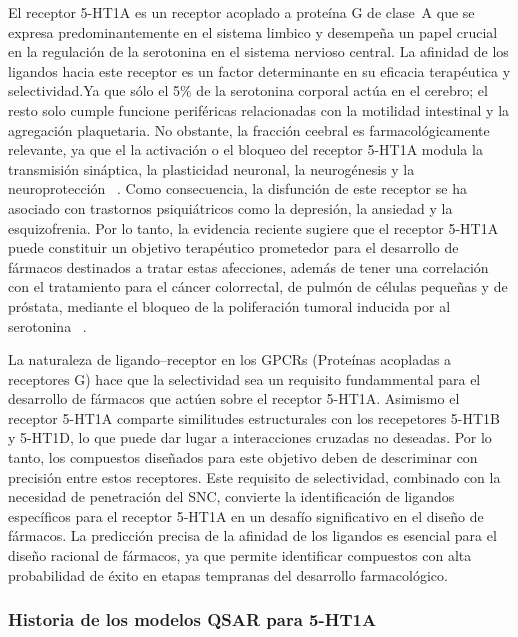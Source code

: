 El receptor 5-HT1A es un receptor acoplado a proteína G de clase~A que se expresa predominantemente en el sistema limbico y desempeña un papel crucial en la regulación de la serotonina en el sistema nervioso central. La afinidad de los ligandos hacia este receptor es un factor determinante en su eficacia terapéutica y selectividad.Ya que sólo el 5\% de la serotonina corporal actúa en el cerebro; el resto solo cumple funcione periféricas relacionadas con la motilidad intestinal y la agregación plaquetaria. No obstante, la fracción ceebral es farmacológicamente relevante, ya que el la activación o el bloqueo del receptor 5-HT1A modula la transmisión sináptica, la plasticidad neuronal, la neurogénesis y la neuroprotección ~\cite{czub_curated_2021}. Como consecuencia, la disfunción de este receptor se ha asociado con trastornos psiquiátricos como la depresión, la ansiedad y la esquizofrenia. Por lo tanto, la evidencia reciente sugiere que el receptor 5-HT1A puede constituir un objetivo terapéutico prometedor para el desarrollo de fármacos destinados a tratar estas afecciones, además de tener una correlación con el tratamiento para el cáncer colorrectal, de pulmón de células pequeñas y de próstata, mediante el bloqueo de la poliferación tumoral inducida por al serotonina ~\cite{czub_curated_2021}.


La naturaleza de ligando--receptor en los GPCRs (Proteínas acopladas a receptores G) hace que la selectividad sea un requisito fundammental para el desarrollo de fármacos que actúen sobre el receptor 5-HT1A. Asimismo el receptor 5-HT1A comparte similitudes estructurales con los recepetores 5-HT1B y 5-HT1D, lo que puede dar lugar a interacciones cruzadas no deseadas. Por lo tanto, los compuestos diseñados para este objetivo deben de descriminar con precisión entre estos receptores. Este requisito de selectividad, combinado con la necesidad de penetración del SNC, convierte la identificación de ligandos específicos para el receptor 5-HT1A en un desafío significativo en el diseño de fármacos. La predicción precisa de la afinidad de los ligandos es esencial para el diseño racional de fármacos, ya que permite identificar compuestos con alta probabilidad de éxito en etapas tempranas del desarrollo farmacológico. 

\subsubsection{Historia de los modelos QSAR para 5-HT1A}

